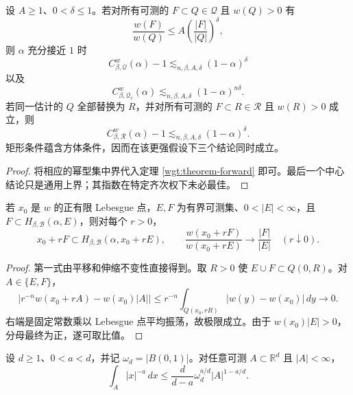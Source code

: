 \begin{corollary}[定量集中条件]\label{wgt:corollary-power-conc}
设 \(A\geq1\)、\(0<\delta\leq1\)。若对所有可测的 \(F\subset Q\in\mathcal Q\) 且 \(w(Q)>0\) 有
\begin{equation}
 \frac{w(F)}{w(Q)}\leq A\left(\frac{|F|}{|Q|}\right)^\delta,
\label{wgt:power-concentration-cube}
\end{equation}
则 \(\alpha\) 充分接近 \(1\) 时
\[
 C^w_{\beta,\mathcal Q}(\alpha)-1\lesssim_{n,\beta,A,\delta}(1-\alpha)^\delta
\]
以及
\[
 C^w_{\beta,\mathcal Q_c}(\alpha)
 \lesssim_{n,\beta,A,\delta}(1-\alpha)^{n\delta}.
\]
若同一估计的 \(Q\) 全部替换为 \(R\)，并对所有可测的 \(F\subset R\in\mathcal R\) 且 \(w(R)>0\) 成立，则
\[
 C^w_{\beta,\mathcal R}(\alpha)-1\lesssim_{n,\beta,A,\delta}(1-\alpha)^\delta.
\]
矩形条件蕴含方体条件，因而在该更强假设下三个结论同时成立。
\end{corollary}

\begin{proof}
将相应的幂型集中界代入定理 \ref{wgt:theorem-forward} 即可。最后一个中心结论只是通用上界；其指数在特定齐次权下未必最佳。
\end{proof}

\begin{proposition}\label{wgt:proposition-localization}
若 \(x_0\) 是 \(w\) 的正有限 Lebesgue 点，\(E,F\) 为有界可测集、\(0<|E|<\infty\)，且
\(F\subset H_{\beta,\mathcal B}(\alpha,E)\)，则对每个 \(r>0\)，
\begin{equation}
 x_0+rF\subset H_{\beta,\mathcal B}(\alpha,x_0+rE),
\qquad
 \frac{w(x_0+rF)}{w(x_0+rE)}\longrightarrow\frac{|F|}{|E|}\quad(r\downarrow0).
\label{wgt:localization}
\end{equation}
\end{proposition}

\begin{proof}
第一式由平移和伸缩不变性直接得到。取 \(R>0\) 使 \(E\cup F\subset Q(0,R)\)。对
\(A\in\{E,F\}\)，
\[
 \left|r^{-n}w(x_0+rA)-w(x_0)|A|\right|
 \leq r^{-n}\int_{Q(x_0,rR)}|w(y)-w(x_0)|\,dy\longrightarrow0.
\]
右端是固定常数乘以 Lebesgue 点平均振荡，故极限成立。由于 \(w(x_0)|E|>0\)，分母最终为正，遂可取比值。
\end{proof}

\begin{lemma}[径向奇性积分]\label{wgt:lemma-singular-integral}
设 \(d\geq1\)、\(0<a<d\)，并记 \(\omega_d=|B(0,1)|\)。对任意可测 \(A\subset\mathbb R^d\) 且 \(|A|<\infty\)，
\begin{equation}
 \int_A|x|^{-a}\,dx
 \leq\frac d{d-a}\omega_d^{a/d}|A|^{1-a/d}.
\label{wgt:singular-integral}
\end{equation}
\end{lemma}

